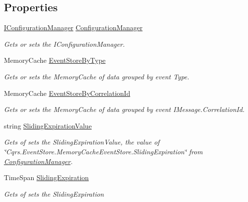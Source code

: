 \subsection*{Properties}
\begin{DoxyCompactItemize}
\item 
\hyperlink{interfaceCqrs_1_1Configuration_1_1IConfigurationManager}{I\+Configuration\+Manager} \hyperlink{classCqrs_1_1Events_1_1MemoryCacheEventStore_a8a4fc4fa5d767e4d15344daf1ba7ea01_a8a4fc4fa5d767e4d15344daf1ba7ea01}{Configuration\+Manager}
\begin{DoxyCompactList}\small\item\em Gets or sets the I\+Configuration\+Manager. \end{DoxyCompactList}\item 
Memory\+Cache \hyperlink{classCqrs_1_1Events_1_1MemoryCacheEventStore_afc04a822655f1e23a1cce8ed1a40627f_afc04a822655f1e23a1cce8ed1a40627f}{Event\+Store\+By\+Type}
\begin{DoxyCompactList}\small\item\em Gets or sets the Memory\+Cache of data grouped by event Type. \end{DoxyCompactList}\item 
Memory\+Cache \hyperlink{classCqrs_1_1Events_1_1MemoryCacheEventStore_a6f317c9f46dfd65d7398b010f484b687_a6f317c9f46dfd65d7398b010f484b687}{Event\+Store\+By\+Correlation\+Id}
\begin{DoxyCompactList}\small\item\em Gets or sets the Memory\+Cache of data grouped by event I\+Message.\+Correlation\+Id. \end{DoxyCompactList}\item 
string \hyperlink{classCqrs_1_1Events_1_1MemoryCacheEventStore_af45012b233f4f4c8ef3c00bf8fba7a80_af45012b233f4f4c8ef3c00bf8fba7a80}{Sliding\+Expiration\+Value}
\begin{DoxyCompactList}\small\item\em Gets of sets the Sliding\+Expiration\+Value, the value of \char`\"{}\+Cqrs.\+Event\+Store.\+Memory\+Cache\+Event\+Store.\+Sliding\+Expiration\char`\"{} from \hyperlink{classCqrs_1_1Events_1_1MemoryCacheEventStore_a8a4fc4fa5d767e4d15344daf1ba7ea01_a8a4fc4fa5d767e4d15344daf1ba7ea01}{Configuration\+Manager}. \end{DoxyCompactList}\item 
Time\+Span \hyperlink{classCqrs_1_1Events_1_1MemoryCacheEventStore_a93423872cdd702ee6257c0cc704c0c06_a93423872cdd702ee6257c0cc704c0c06}{Sliding\+Expiration}
\begin{DoxyCompactList}\small\item\em Gets of sets the Sliding\+Expiration \end{DoxyCompactList}\end{DoxyCompactItemize}
